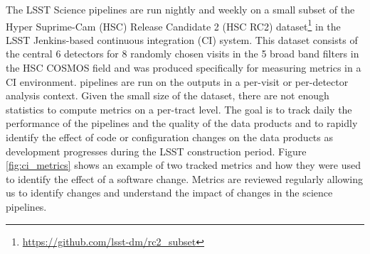 The LSST Science pipelines are run nightly and weekly on a small subset of the Hyper Suprime-Cam (HSC) Release Candidate 2 (HSC RC2) dataset\footnote{\url{https://github.com/lsst-dm/rc2_subset}} in the LSST Jenkins-based continuous integration (CI) system.
This dataset consists of the central 6 detectors for 8 randomly chosen visits in the 5 broad band filters in the HSC COSMOS field and was produced specifically for measuring metrics in a CI environment.
\faro pipelines are run on the outputs in a per-visit or per-detector analysis context.
Given the small size of the dataset, there are not enough statistics to compute metrics on a per-tract level.
The goal is to track daily the performance of the pipelines and the quality of the data products and to rapidly identify the effect of code or configuration changes on the data products as development progresses during the LSST construction period.
Figure \ref{fig:ci_metrics} shows an example of two tracked metrics and how they were used to identify the effect of a software change.
Metrics are reviewed regularly allowing us to identify changes and understand the impact of changes in the science pipelines.
